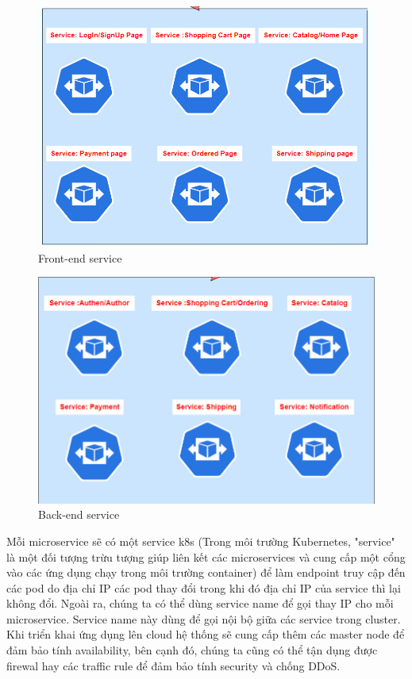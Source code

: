  \begin{figure}[H]
    \begin{center}
    \includegraphics[scale = 0.6]{images/phat/frontend-service.jpg}
    \vspace*{7mm}
    \caption{Front-end service}
    \end{center}
    \label{}
\end{figure}
 \begin{figure}[H]
    \begin{center}
    \includegraphics[scale = 0.6]{images/phat/backend-service.jpg}
    \vspace*{7mm}
    \caption{Back-end service}
    \end{center}
    \label{}
\end{figure}

\noindent Mỗi microservice sẽ có một service k8s (Trong môi trường Kubernetes, "service" là một đối tượng trừu tượng giúp liên kết các microservices và cung cấp một cổng vào các ứng dụng chạy trong môi trường container) để làm endpoint truy cập đến các pod do địa chỉ IP các pod thay đổi trong khi đó địa chỉ IP của service thì lại không đổi. Ngoài ra, chúng ta có thể dùng service name để gọi thay IP cho mỗi microservice. Service name này dùng để gọi nội bộ giữa các service trong cluster. Khi triển khai ứng dụng lên cloud hệ thống sẽ cung cấp thêm các master node để đảm bảo tính availability, bên cạnh đó, chúng ta cũng có thể tận dụng được firewal hay các traffic rule để đảm bảo tính security và chống DDoS.

